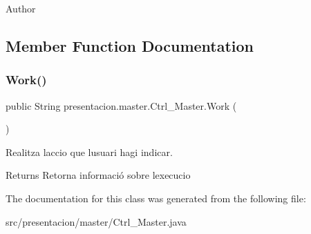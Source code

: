 \begin{DoxyAuthor}{Author}

\end{DoxyAuthor}


\subsection{Member Function Documentation}
\mbox{\label{classpresentacion_1_1master_1_1Ctrl__Master_aa25099e202de5e076b950e4e3bf5c26b}} 
\subsubsection{\texorpdfstring{Work()}{Work()}}
{\footnotesize\ttfamily public String presentacion.\+master.\+Ctrl\+\_\+\+Master.\+Work (\begin{DoxyParamCaption}{ }\end{DoxyParamCaption})\hspace{0.3cm}{\ttfamily [inline]}}



Realitza l\textquotesingle{}accio que l\textquotesingle{}usuari hagi indicar. 

\begin{DoxyReturn}{Returns}
Retorna informació sobre l\textquotesingle{}execucio 
\end{DoxyReturn}


The documentation for this class was generated from the following file\+:\begin{DoxyCompactItemize}
\item 
src/presentacion/master/Ctrl\+\_\+\+Master.\+java\end{DoxyCompactItemize}
